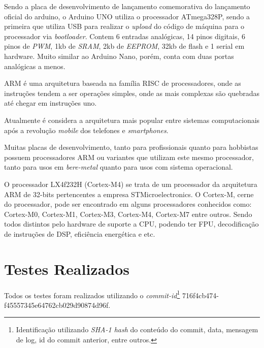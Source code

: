 Sendo a placa de desenvolvimento de lançamento comemorativa do lançamento oficial do arduino, o Arduino UNO utiliza o processador ATmega328P, sendo a primeira que utiliza USB para realizar o \textit{upload} do código de máquina para o processador via \textit{bootloader}. Contem 6 entradas analógicas, 14 pinos digitais, 6 pinos de \textit{PWM}, 1kb de \textit{SRAM}, 2kb de \textit{EEPROM}, 32kb de flash e 1 serial em hardware. Muito similar ao Arduino Nano, porém, conta com duas portas analógicas a menos.


ARM é uma arquitetura baseada na família RISC de processadores, onde as instruções tendem a ser operações simples, onde as mais complexas são quebradas até chegar em instruções uno.

Atualmente é considera a arquitetura mais popular entre sistemas computacionais após a revolução \textit{mobile} dos telefones e \textit{smartphones}.

Muitas placas de desenvolvimento, tanto para profissionais quanto para hobbistas possuem processadores ARM ou variantes que utilizam este mesmo processador, tanto para usos em \textit{bere-metal} quanto para usos com sistema operacional.


O processador LX4f232H (Cortex-M4) se trata de um processador da arquitetura ARM de 32-bits pertencentes a empresa STMicroelectronics. O Cortex-M, cerne do processador, pode ser encontrado em alguns processadores conhecidos como: Cortex-M0, Cortex-M1, Cortex-M3, Cortex-M4, Cortex-M7 entre outros. Sendo todos distintos pelo hardware de suporte a CPU, podendo ter FPU, decodificação de instruções de DSP, eficiência energética e etc.


\section{Testes Realizados}

Todos os testes foram realizados utilizando o \textit{commit-id}\footnote{Identificação utilizando \textit{SHA-1 hash} do conteúdo do commit, data, mensagem de log, id do commit anterior, entre outros.} 716f4cb474-\\f45557345e64762cb029d90874d96f.

